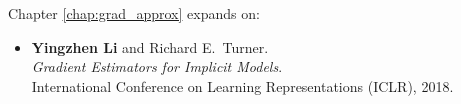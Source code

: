 \begin{publication}

Chapter \ref{chap:grad_approx} expands on:
\begin{itemize}
\item \textbf{Yingzhen Li} and Richard E.~Turner. \\
\emph{Gradient Estimators for Implicit Models}. \\
International Conference on Learning Representations (ICLR), 2018.
\end{itemize}


\end{publication}
